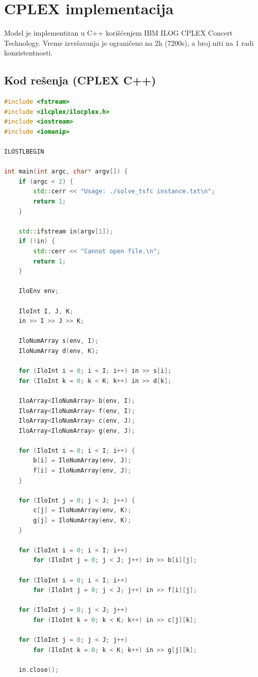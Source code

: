 \documentclass[12pt,a4paper]{article}
\begin{document}
\section{CPLEX implementacija}
Model je implementiran u C++ korišćenjem IBM ILOG CPLEX Concert Technology.
Vreme izvršavanja je ograničeno na 2h (7200s), a broj niti na 1 radi konzistentnosti.

\subsection*{Kod rešenja (CPLEX C++)}
\begin{lstlisting}[language=C++]
#include <fstream>
#include <ilcplex/ilocplex.h>
#include <iostream>
#include <iomanip>

ILOSTLBEGIN

int main(int argc, char* argv[]) {
    if (argc < 2) {
        std::cerr << "Usage: ./solve_tsfc instance.txt\n";
        return 1;
    }

    std::ifstream in(argv[1]);
    if (!in) {
        std::cerr << "Cannot open file.\n";
        return 1;
    }

    IloEnv env;

    IloInt I, J, K;
    in >> I >> J >> K;

    IloNumArray s(env, I);
    IloNumArray d(env, K);

    for (IloInt i = 0; i < I; i++) in >> s[i];
    for (IloInt k = 0; k < K; k++) in >> d[k];

    IloArray<IloNumArray> b(env, I);
    IloArray<IloNumArray> f(env, I);
    IloArray<IloNumArray> c(env, J);
    IloArray<IloNumArray> g(env, J);

    for (IloInt i = 0; i < I; i++) {
        b[i] = IloNumArray(env, J);
        f[i] = IloNumArray(env, J);
    }

    for (IloInt j = 0; j < J; j++) {
        c[j] = IloNumArray(env, K);
        g[j] = IloNumArray(env, K);
    }

    for (IloInt i = 0; i < I; i++)
        for (IloInt j = 0; j < J; j++) in >> b[i][j];

    for (IloInt i = 0; i < I; i++)
        for (IloInt j = 0; j < J; j++) in >> f[i][j];

    for (IloInt j = 0; j < J; j++)
        for (IloInt k = 0; k < K; k++) in >> c[j][k];

    for (IloInt j = 0; j < J; j++)
        for (IloInt k = 0; k < K; k++) in >> g[j][k];

    in.close();


\end{lstlisting}
\end{document}
